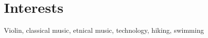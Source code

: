 \documentclass[letterpaper]{twentysecondcv}
\begin{document}


\section{Interests}

Violin, classical music, etnical music, technology, hiking, swimming

\cvprivacy
\end{document}
